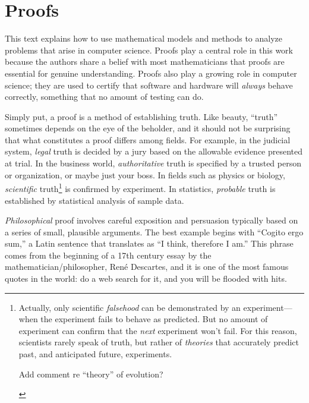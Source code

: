 \part{Proofs}
\label{part:proofs}


\partintro
{}

This text explains how to use mathematical models and methods to analyze
problems that arise in computer science.  Proofs play a central role in
this work because the authors share a belief with most mathematicians that
proofs are essential for genuine understanding.  Proofs also play a
growing role in computer science; they are used to certify that software
and hardware will \emph{always} behave correctly, something that no amount
of testing can do.

Simply put, a proof is a method of establishing truth.  Like beauty,
``truth'' sometimes depends on the eye of the beholder, and it should
not be surprising that what constitutes a proof differs among fields.
For example, in the judicial system, \emph{legal} truth is decided by
a jury based on the allowable evidence presented at trial.  In the
business world, \emph{authoritative} truth is specified by a trusted
person or organization, or maybe just your boss.  In fields such as
physics or biology, \emph{scientific} truth\footnote{Actually, only
  scientific \emph{falsehood} can be demonstrated by an
  experiment---when the experiment fails to behave as predicted.  But
  no amount of experiment can confirm that the \emph{next} experiment
  won't fail.  For this reason, scientists rarely speak of truth, but
  rather of \emph{theories} that accurately predict past, and
  anticipated future, experiments.
\begin{editingnotes}
Add comment re ``theory'' of evolution?
\end{editingnotes}
} is confirmed by experiment.  In statistics,
\emph{probable} truth is established by statistical analysis of sample
data.

\emph{Philosophical} proof involves careful exposition and persuasion
typically based on a series of small, plausible arguments.  The best
example begins with ``Cogito ergo sum,'' a Latin sentence that
translates as ``I think, therefore I am.''  This phrase comes from the
beginning of a 17th century essay by the mathematician/philosopher,
Ren\'e Descartes, and it is one of the most famous quotes in the
world: do a web search for it, and you will be flooded with
hits.

